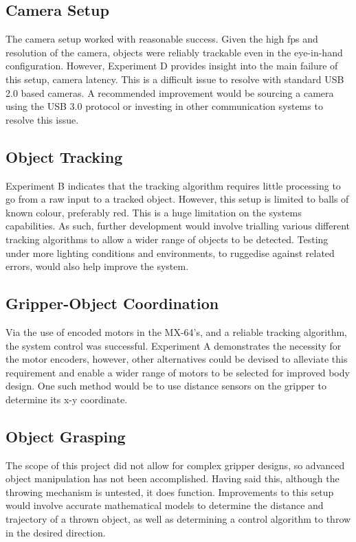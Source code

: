 \documentclass[conference]{IEEEtran}
\begin{document}
\subsection{Camera Setup}
The camera setup worked with reasonable success. Given the high fps and resolution of the camera, objects were reliably trackable even in the eye-in-hand configuration. However, Experiment D provides insight into the main failure of this setup, camera latency. This is a difficult issue to resolve with standard USB 2.0 based cameras. A recommended improvement would be sourcing a camera using the USB 3.0 protocol or investing in other communication systems to resolve this issue.

\subsection{Object Tracking}
Experiment B indicates that the tracking algorithm requires little processing to go from a raw input to a tracked object. However, this setup is limited to balls of known colour, preferably red. This is a huge limitation on the systems capabilities. As such, further development would involve trialling various different tracking algorithms to allow a wider range of objects to be detected. Testing under more lighting conditions and environments, to ruggedise against related errors, would also help improve the system.

\subsection{Gripper-Object Coordination}
Via the use of encoded motors in the MX-64's, and a reliable tracking algorithm, the system control was successful. Experiment A demonstrates the necessity for the motor encoders, however, other alternatives could be devised to alleviate this requirement and enable a wider range of motors to be selected for improved body design. One such method would be to use distance sensors on the gripper to determine its x-y coordinate.

\subsection{Object Grasping}
The scope of this project did not allow for complex gripper designs, so advanced object manipulation has not been accomplished. Having said this, although the throwing mechanism is untested, it does function. Improvements to this setup would involve accurate mathematical models to determine the distance and trajectory of a thrown object, as well as determining a control algorithm to throw in the desired direction.
\end{document}
